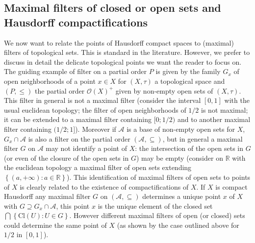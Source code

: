 \documentclass[11pt]{amsart}
\theoremstyle{plain}
\theoremstyle{definition}
\newtheorem{definition}[theorem]{Definition}
\theoremstyle{plain}
\theoremstyle{remark}
\newcommand{\Cl}[1]{\mathrm{Cl}\left(#1\right)}
\newcommand{\bp}[1]{\left\lbrace #1 \right\rbrace}
\newcommand{\0}{\mathsf{0}}
\renewcommand{\1}{\mathsf{1}}
\renewcommand{\2}{\mathsf{2}}
\theoremstyle{definition}
\begin{document}
 \subsection{Maximal filters of closed or open sets and Hausdorff compactifications}
 We now want to relate the points of Hausdorff compact spaces to (maximal) filters of topological sets. This is standard in the literature. However, we prefer to discuss in detail the delicate topological points we want the reader to focus on.
% 
%
The guiding example of filter on a partial order $P$ is given by the family $G_x$ of open neighborhoods of a point $x\in X$  for $(X,\tau)$ a topological space and $(P,\leq)$ the partial order $\mathcal{O}(X)^+$ given by non-empty open sets of $(X,\tau)$. 
This filter in general is not a maximal filter (consider the interval $[0,1]$ with the usual euclidean topology; the filter of open neighborhoods of $1/2$ is not maximal; it can be extended to a maximal filter containing $[0;1/2)$ and to another maximal filter containing $(1/2;1]$).
Moreover if $\mathcal{A}$ is a base of non-empty open sets for $X$, $G_x\cap\mathcal{A}$
is also a filter on the partial order $(\mathcal{A},\subseteq)$, but in general a maximal filter $G$ on 
$\mathcal{A}$
may not identify a point of $X$: the intersection of the open sets in $G$ (or even of the closure of the open sets in $G$) may be empty (consider on $\mathbb{R}$ with the euclidean topology a maximal filter of open sets extending 
$\bp{(a,+\infty):a\in\mathbb{R}}$). This identification of maximal filters of open sets to points of $X$ 
is clearly related to the existence of compactifications of $X$.
If $X$ is compact Hausdorff any maximal filter $G$ on $(\mathcal{A},\subseteq)$ determines a unique point 
$x$ of $X$ with $G\supseteq G_x\cap\mathcal{A}$, this point $x$ is the unique
element of the closed set $\bigcap\bp{\Cl{U}:U\in G}$. 
However different maximal filters of open (or closed) sets
could determine the same point of $X$ (as shown by the case outlined above for $1/2$ in $[0,1]$).
\end{document}
